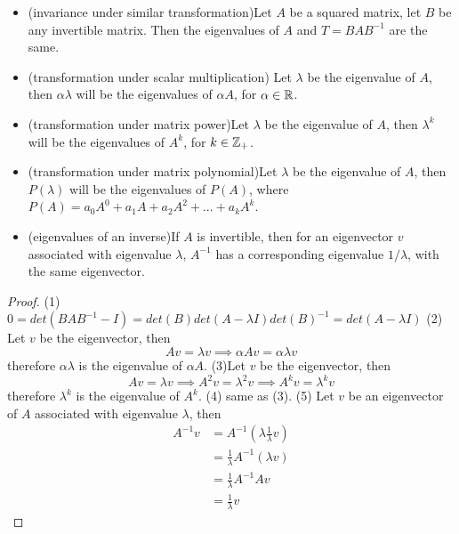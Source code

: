 \begin{refsection}
\begin{theorem}\label{ch:linearalgebra:th:eigenvalueproperty}\hfill
\begin{itemize}
	\item (invariance under similar transformation)Let $A$ be a squared matrix, let $B$ be any invertible matrix. Then the eigenvalues
	of $A$ and $T = BAB^{-1}$ are the same. 
	\item (transformation under scalar multiplication) Let $\lambda$ be the eigenvalue of $A$, then $\alpha \lambda$ will be the eigenvalues of $\alpha A$, for $\alpha\in \mathbb{R}$.
	\item (transformation under matrix power)Let $\lambda$ be the eigenvalue of $A$, then $\lambda^k$ will be the eigenvalues of $A^k$, for $k\in \mathbb{Z}_+$.
	\item (transformation under matrix polynomial)Let $\lambda$ be the eigenvalue of $A$, then $P(\lambda)$ will be the eigenvalues of $P(A)$, where $P(A) = a_0 A^0 + a_1A + a_2 A^2 + ... + a_k A^k$.
	\item (eigenvalues of an inverse)If $A$ is invertible, then for an eigenvector $v$ associated with eigenvalue $\lambda$, $A^{-1}$ has a corresponding eigenvalue $1/\lambda$, with the same eigenvector.  
\end{itemize} 
\end{theorem}
\begin{proof}
	(1)
$0=det(BAB^{-1} - I) = det(B)det(A - \lambda I) det(B)^{-1} = det(A - \lambda I)$
(2) Let $v$ be the eigenvector, then $$Av = \lambda v \implies \alpha Av = \alpha \lambda v$$
therefore $\alpha\lambda$ is the eigenvalue of $\alpha A$.
(3)Let $v$ be the eigenvector, then $$Av = \lambda v \implies A^2v = \lambda^2 v \implies A^kv = \lambda^k v$$
therefore $\lambda^k$ is the eigenvalue of $A^k$.
(4) same as (3).
(5) Let $v$ be an eigenvector of $A$ associated with eigenvalue $\lambda$, then
\begin{align*}
A^{-1}v &= A^{-1}(\lambda \frac{1}{\lambda} v)\\
&=\frac{1}{\lambda} A^{-1}(\lambda v)\\
&=\frac{1}{\lambda} A^{-1}Av\\
&=\frac{1}{\lambda} v
\end{align*}
\end{proof}




\end{refsection}
